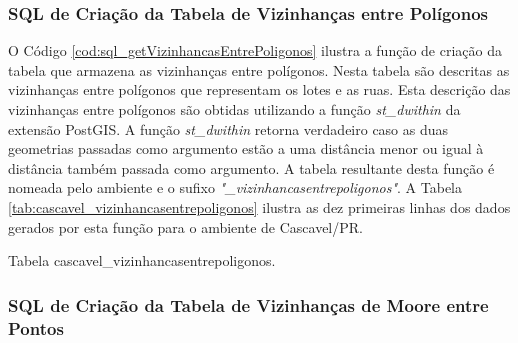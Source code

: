 \subsubsection{SQL de Criação da Tabela de Vizinhanças entre Polígonos}

O Código \ref{cod:sql_getVizinhancasEntrePoligonos} ilustra a função de criação da tabela que armazena as vizinhanças entre polígonos. Nesta tabela são descritas as vizinhanças entre polígonos que representam os lotes e as ruas. Esta descrição das vizinhanças entre polígonos são obtidas utilizando a função \textit{st\_dwithin} da extensão PostGIS. A função \textit{st\_dwithin} retorna verdadeiro caso as duas geometrias passadas como argumento estão a uma distância menor ou igual à distância também passada como argumento. A tabela resultante desta função é nomeada pelo ambiente e o sufixo \textit{"\_vizinhancasentrepoligonos"}. A Tabela \ref{tab:cascavel_vizinhancasentrepoligonos} ilustra as dez primeiras linhas dos dados gerados por esta função para o ambiente de Cascavel/PR.



\begin{table}[H]
\centering
{}
\caption{Tabela cascavel\_vizinhancasentrepoligonos.}
\label{tab:cascavel_vizinhancasentrepoligonos}
\end{table}

\subsubsection{SQL de Criação da Tabela de Vizinhanças de Moore entre Pontos}

